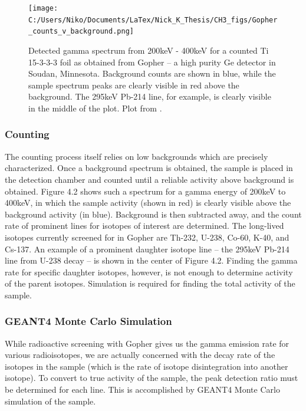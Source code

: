 \documentclass{report}
\begin{document}
\begin{figure}
\centering
\texttt{[image: C:/Users/Niko/Documents/LaTex/Nick\_K\_Thesis/CH3\_figs/Gopher\_counts\_v\_background.png]}
\caption{Detected gamma spectrum from 200keV - 400keV for a counted Ti 15-3-3-3 foil as obtained from Gopher -- a high purity Ge detector in Soudan, Minnesota. Background counts are shown in blue, while the sample spectrum peaks are clearly visible in red above the background. The 295keV Pb-214 line, for example, is clearly visible in the middle of the plot. Plot from \cite{GopherTi15333}.}
\end{figure}

\subsubsection{Counting}
The counting process itself relies on low backgrounds which are precisely characterized. Once a background spectrum is obtained, the sample is placed in the detection chamber and counted until a reliable activity above background is obtained. Figure 4.2 shows such a spectrum for a gamma energy of 200keV to 400keV, in which the sample activity (shown in red) is clearly visible above the background activity (in blue). Background is then subtracted away, and the count rate of prominent lines for isotopes of interest are determined. The long-lived isotopes currently screened for in Gopher are Th-232, U-238, Co-60, K-40, and Cs-137. An example of a prominent daughter isotope line -- the 295keV Pb-214 line from U-238 decay -- is shown in the center of Figure 4.2. Finding the gamma rate for specific daughter isotopes, however, is not enough to determine activity of the parent isotopes. Simulation is required for finding the total activity of the sample.

\subsubsection{GEANT4 Monte Carlo Simulation}
While radioactive screening with Gopher gives us the gamma emission rate for various radioisotopes, we are actually concerned with the decay rate of the isotopes in the sample (which is the rate of isotope disintegration into another isotope). To convert to true activity of the sample, the peak detection ratio must be determined for each line. This is accomplished by GEANT4 Monte Carlo simulation of the sample.
\end{document}
